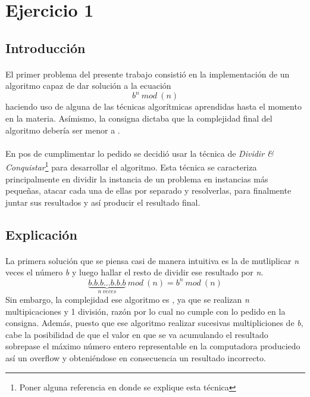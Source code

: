 \section{Ejercicio 1}

\subsection{Introducción}

\paragraph{}
El primer problema del presente trabajo consistió en la implementación de un algoritmo capaz de dar solución a la ecuación 
	\begin{equation} 
		b^n\ mod\ (n)
	\label{problema}
	\end{equation}
haciendo uso de alguna de las técnicas algorítmicas aprendidas hasta el momento en la materia. Asímismo, la consigna dictaba que la complejidad final del algoritmo debería ser menor a .\\

\paragraph{}
En pos de cumplimentar lo pedido se decidió usar la técnica de \textit{Dividir \& Conquistar}\footnote{Poner alguna referencia 	en donde se explique esta técnica} para desarrollar el algoritmo. Esta técnica se caracteriza principalmente en dividir la instancia de un problema en instancias más pequeñas, atacar cada una de ellas por separado y resolverlas, para finalmente juntar sus resultados y así producir el resultado final.

\subsection{Explicación}

\paragraph{}
La primera solución que se piensa casi de manera intuitiva es la de mutliplicar \textit{n} veces el número \textit{b} y luego hallar el resto de dividir ese resultado por \textit{n}. 
	\begin{equation}
		\underbrace{b.b.b \hdots b.b.b}_{n\ veces}\ mod\ (n)  = b^n\ mod\ (n)
	\label{primera_idea}		
	\end{equation}
Sin embargo, la complejidad ese algoritmo es , ya que se realizan \textit{n} multipicaciones y 1 división, razón por lo cual no cumple con lo pedido en la consigna. Además, puesto que ese algoritmo realizar sucesivas multipliciones de \textit{b}, cabe la posibilidad de que el valor en que se va acumulando el resultado sobrepase el máximo número entero representable en la computadora produciedo así un overflow y obteniéndose en consecuencia un resultado incorrecto. \\

